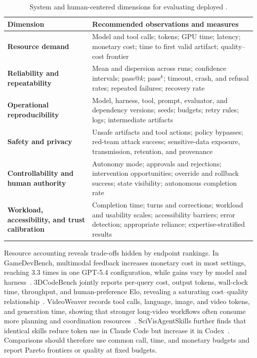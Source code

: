 \begin{table}[t]
  \caption{System and human-centered dimensions for evaluating deployed \AVG{}.}
  \label{tab:system-human-evaluation}
  \small
  \setlength{\tabcolsep}{5pt}
  \renewcommand{\arraystretch}{1.08}
  \renewcommand{\tabularxcolumn}[1]{m{#1}}
  \begin{tabularx}{\textwidth}{@{}
    >{\raggedright\arraybackslash\bfseries}m{}
    >{\raggedright\arraybackslash}X@{}}
    \toprule
    Dimension & \textbf{Recommended observations and measures} \\
    \midrule
    Resource demand & Model and tool calls; tokens; GPU time; latency; monetary cost; time to first valid artifact; quality--cost frontier \\
    \midrule
    Reliability and repeatability & Mean and dispersion across runs; confidence intervals; pass@$k$; pass$^k$; timeout, crash, and refusal rates; repeated failures; recovery rate \\
    \midrule
    Operational reproducibility & Model, harness, tool, prompt, evaluator, and dependency versions; seeds; budgets; retry rules; logs; intermediate artifacts \\
    \midrule
    Safety and privacy & Unsafe artifacts and tool actions; policy bypasses; red-team attack success; sensitive-data exposure, transmission, retention, and provenance \\
    \midrule
    Controllability and human authority & Autonomy mode; approvals and rejections; intervention opportunities; override and rollback success; state visibility; autonomous completion rate \\
    \midrule
    Workload, accessibility, and trust calibration & Completion time; turns and corrections; workload and usability scales; accessibility barriers; error detection; appropriate reliance; expertise-stratified results \\
    \bottomrule
  \end{tabularx}
\end{table}
\FloatBarrier

Resource accounting reveals trade-offs hidden by endpoint rankings. In GameDevBench, multimodal feedback increases monetary cost in most settings, reaching 3.3 times in one GPT-5.4 configuration, while gains vary by model and harness~\cite{avg260211103}. 3DCodeBench jointly reports per-query cost, output tokens, wall-clock time, throughput, and human-preference Elo, revealing a saturating cost--quality relationship~\cite{avg260601057}. VideoWeaver records tool calls, language, image, and video tokens, and generation time, showing that stronger long-video workflows often consume more planning and coordination resources~\cite{avg260608091}. SciVisAgentSkills further finds that identical skills reduce token use in Claude Code but increase it in Codex~\cite{avg260605525}. Comparisons should therefore use common call, time, and monetary budgets and report Pareto frontiers or quality at fixed budgets.


